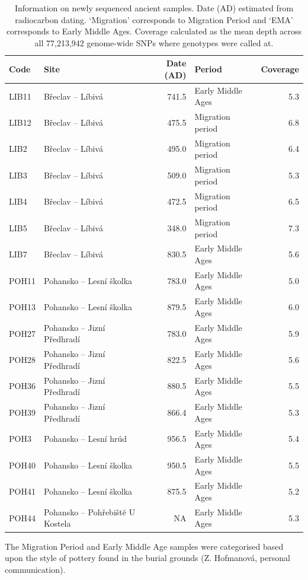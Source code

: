 \begin{table}
\centering
\begin{tabular}[t]{llrlr}
\toprule
Code & Site & Date (AD) & Period & Coverage\\
\midrule
LIB11 & Břeclav – Líbivá & 741.5 & Early Middle Ages & 5.3\\
LIB12 & Břeclav – Líbivá & 475.5 & Migration period & 6.8\\
LIB2 & Břeclav – Líbivá & 495.0 & Migration period & 6.4\\
LIB3 & Břeclav – Líbivá & 509.0 & Migration period & 5.3\\
LIB4 & Břeclav – Líbivá & 472.5 & Migration period & 6.5\\
\addlinespace
LIB5 & Břeclav – Líbivá & 348.0 & Migration period & 7.3\\
LIB7 & Břeclav – Líbivá & 830.5 & Early Middle Ages & 5.6\\
POH11 & Pohansko – Lesní školka & 783.0 & Early Middle Ages & 5.0\\
POH13 & Pohansko – Lesní školka & 879.5 & Early Middle Ages & 6.0\\
POH27 & Pohansko – Jizní Předhradí & 783.0 & Early Middle Ages & 5.9\\
\addlinespace
POH28 & Pohansko – Jizní Předhradí & 822.5 & Early Middle Ages & 5.6\\
POH36 & Pohansko – Jizní Předhradí & 880.5 & Early Middle Ages & 5.5\\
POH39 & Pohansko – Jizní Předhradí & 866.4 & Early Middle Ages & 5.3\\
POH3 & Pohansko – Lesní hrúd & 956.5 & Early Middle Ages & 5.4\\
POH40 & Pohansko – Lesní školka & 950.5 & Early Middle Ages & 5.5\\
\addlinespace
POH41 & Pohansko – Lesní školka & 875.5 & Early Middle Ages & 5.2\\
POH44 & Pohansko – Pohřebištĕ U Kostela & NA & Early Middle Ages & 5.3\\
\bottomrule
\end{tabular}
\caption{Information on newly sequenced ancient samples. Date (AD) estimated from radiocarbon dating. `Migration' corresponds to Migration Period and `EMA' corresponds to Early Middle Ages. Coverage calculated as the mean depth across all 77,213,942 genome-wide SNPs where genotypes were called at.}
\label{tab:AncientSamples}
\end{table}

The Migration Period and Early Middle Age samples were categorised based upon the style of pottery found in the burial grounds (Z. Hofmanová, personal communication).  


